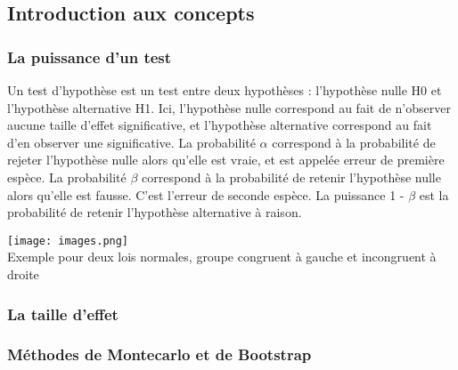 \documentclass[a4paper,11pt]{article}
\begin{document}
\subsection{Introduction aux concepts}
\subsubsection{La puissance d'un test}
Un test d'hypothèse est un test entre deux hypothèses : l'hypothèse nulle H0 et l'hypothèse alternative H1. Ici, l'hypothèse nulle correspond au fait de n'observer aucune taille d'effet significative, et l'hypothèse alternative correspond au fait d'en observer une significative. La probabilité $\alpha$ correspond à la probabilité de rejeter l'hypothèse nulle alors qu'elle est vraie, et est appelée erreur de première espèce.
La probabilité $\beta$ correspond  à la probabilité de retenir l'hypothèse nulle alors qu'elle est fausse. C'est l'erreur de seconde espèce. La puissance 1 - $\beta$ est la probabilité de retenir l'hypothèse alternative à raison.
\begin{center}
\texttt{[image: images.png]}\\
Exemple pour deux lois normales, groupe congruent à gauche et incongruent à droite
\end{center}

\subsubsection{La taille d'effet}
\subsubsection{Méthodes de Montecarlo et de Bootstrap}
\end{document}
